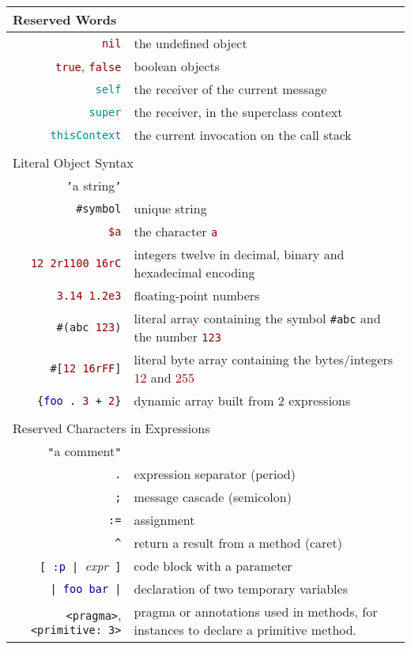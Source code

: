 \noindent
\begin{tabularx}{\linewidth}{@{}rX@{}}
	\multicolumn{2}{l}{Reserved Words}\\
	\midrule
	\textcolor{darkRed}{\texttt{nil}} & the undefined object\\
	\textcolor{darkRed}{\texttt{true}}, \textcolor{darkRed}{\texttt{false}} & boolean objects\\
	\textcolor{darkCyan}{\texttt{self}} & the receiver of the current message\\
	\textcolor{darkCyan}{\texttt{super}} & the receiver, in the superclass context\\
	\textcolor{darkCyan}{\texttt{thisContext}} & the current invocation on the call stack \\
	\\
	\multicolumn{2}{l}{Literal Object Syntax}\\
	\midrule
	\textcolor{string}{\texttt{'}{a string}\texttt{'}} & \\
	\textcolor{string}{\texttt{\#symbol}} & unique string \\
	\textcolor{darkRed}{\texttt{\$a}} & the character \textcolor{darkRed}{\texttt{a}} \\
	\textcolor{darkRed}{\texttt{12 2r1100 16rC}} & integers twelve in decimal, binary and hexadecimal encoding\\
	\textcolor{darkRed}{\texttt{3.14 1.2e3}} & floating-point numbers\\
	\texttt{\#(\textcolor{string}{abc} \textcolor{darkRed}{123})} & literal array containing the symbol \textcolor{string}{\texttt{\#abc}} and the number \textcolor{darkRed}{\texttt{123}} \\
	\texttt{\#[\textcolor{darkRed}{12} \textcolor{darkRed}{16rFF}]} & literal byte array containing the bytes/integers \textcolor{darkRed}{12} and \textcolor{darkRed}{255}\\
	\texttt{\{\textcolor{darkBlue}{foo}\,.\ \textcolor{darkRed}{3}\,+\,\textcolor{darkRed}{2}\}} & dynamic array built from 2 expressions\\
	
	\\
	\multicolumn{2}{l}{Reserved Characters in Expressions}\\
	\midrule
	\textcolor{comment}{\texttt{"}{a comment}\texttt{"}} & \\
	\texttt{.} & expression separator (period)\\
	\texttt{;} & message cascade (semicolon)\\
	\texttt{:=} & {assignment} \\
	\texttt{\textasciicircum} & return a result from a method (caret)\\
	\texttt{[\,:\textcolor{darkBlue}{p}\,|\,}\emph{expr}\texttt{\,]} & code block with a parameter \\
	\texttt{|\,\textcolor{darkBlue}{foo bar}\,|} & declaration of two temporary variables\\
	\texttt{<pragma>}, \texttt{<primitive: 3>} & pragma or annotations used in methods, for instances to declare a primitive method.
\end{tabularx}

